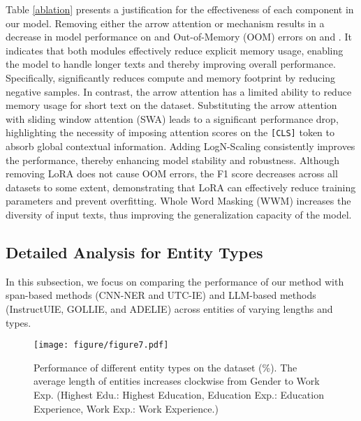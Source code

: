 Table \ref{ablation} presents a justification for the effectiveness of
each component in our model.
Removing either the arrow attention or \biswa mechanism results in a decrease in model performance on \profiling and Out-of-Memory (OOM) errors on \scirex and \oldprofiling. 
It indicates that both modules effectively reduce explicit memory usage, enabling the model to handle longer texts and thereby improving overall performance.
Specifically, \biswa significantly reduces compute and memory footprint by reducing negative samples.
In contrast, the arrow attention has a limited ability to reduce memory usage for short text on the \profiling dataset.
Substituting the arrow attention with sliding window attention (SWA) leads to a significant performance drop, highlighting the necessity of 
imposing attention scores on the \texttt{[CLS]} token  to absorb global contextual information.
Adding LogN-Scaling consistently improves the performance, 
thereby enhancing model stability and robustness. 
Although removing LoRA does not cause OOM errors, the F1 score decreases across all datasets to some extent, demonstrating that LoRA can effectively reduce training parameters and prevent overfitting. 
Whole Word Masking (WWM) increases the diversity of input texts,
thus improving the generalization capacity of the model.

\subsection{Detailed Analysis for Entity Types}

In this subsection, we focus on comparing the performance of our method with span-based methods (CNN-NER and UTC-IE) and LLM-based methods (InstructUIE, GOLLIE, and ADELIE) across entities of varying lengths and types.

\begin{figure}[t]
\centering
\texttt{[image: figure/figure7.pdf]} %
\caption{Performance of different entity types on the \profiling dataset (\%).
The average length of entities increases clockwise from Gender to Work Exp. (Highest Edu.: Highest Education, Education Exp.: Education Experience, Work Exp.: Work Experience.)
}
\label{fig:radar-profiling}
\end{figure}

